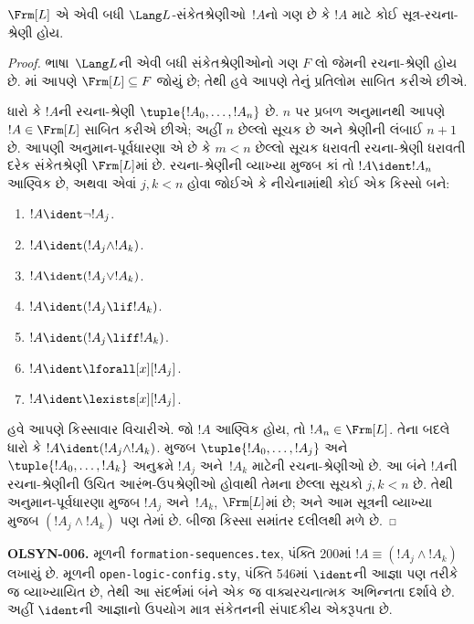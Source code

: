\begin{thm}
$\Frm[L]$ એ એવી બધી $\Lang L$-સંકેતશ્રેણીઓ~$!A$નો ગણ છે કે
$!A$ માટે કોઈ સૂત્ર-રચના-શ્રેણી હોય.
\end{thm}

\begin{proof}
ભાષા~$\Lang L$ની એવી બધી સંકેતશ્રેણીઓનો ગણ $F$ લો જેમની
રચના-શ્રેણી હોય છે. માં આપણે
$\Frm[L] \subseteq F$ જોયું છે; તેથી હવે આપણે તેનું પ્રતિલોમ
સાબિત કરીએ છીએ.

ધારો કે $!A$ની રચના-શ્રેણી $\tuple{!A_0,\dotsc,!A_n}$ છે. $n$ પર
પ્રબળ અનુમાનથી આપણે $!A \in \Frm[L]$ સાબિત કરીએ છીએ; અહીં $n$ છેલ્લો
સૂચક છે અને શ્રેણીની લંબાઈ $n+1$ છે. આપણી અનુમાન-પૂર્વધારણા એ છે કે
$m < n$ છેલ્લો સૂચક ધરાવતી રચના-શ્રેણી ધરાવતી દરેક
સંકેતશ્રેણી $\Frm[L]$માં છે. રચના-શ્રેણીની વ્યાખ્યા મુજબ કાં તો
$!A \ident !A_n$ આણ્વિક છે, અથવા એવાં $j,k < n$ હોવા જોઈએ કે
નીચેનામાંથી કોઈ એક કિસ્સો બને:
\begin{enumerate}
    \item $!A \ident \lnot !A_j$.%
    \item $!A \ident (!A_j \land !A_k)$.%
    \item $!A \ident (!A_j \lor !A_k)$.%
    \item $!A \ident (!A_j \lif !A_k)$.%
    \item $!A \ident (!A_j \liff !A_k)$.%
    \item $!A \ident \lforall[x][!A_j]$.%
    \item $!A \ident \lexists[x][!A_j]$.%
\end{enumerate}
હવે આપણે કિસ્સાવાર વિચારીએ. જો $!A$ આણ્વિક હોય, તો
$!A_n \in \Frm[L]$. તેના બદલે ધારો કે
$!A \ident (!A_j \land !A_k)$. 
મુજબ $\tuple{!A_0,\dotsc,!A_j}$ અને $\tuple{!A_0,\dotsc,!A_k}$ અનુક્રમે
$!A_j$ અને~$!A_k$ માટેની રચના-શ્રેણીઓ છે. આ બંને $!A$ની
રચના-શ્રેણીની ઉચિત આરંભ-ઉપશ્રેણીઓ હોવાથી તેમના છેલ્લા સૂચકો $j,k<n$ છે.
તેથી અનુમાન-પૂર્વધારણા મુજબ $!A_j$ અને~$!A_k$, $\Frm[L]$માં છે;
અને આમ સૂત્રની વ્યાખ્યા મુજબ $(!A_j \land !A_k)$ પણ તેમાં છે.
બીજા કિસ્સા સમાંતર દલીલથી મળે છે.
\end{proof}
\begin{editorial}
\textbf{OLSYN-006.} મૂળની \texttt{formation-sequences.tex}, પંક્તિ 200માં $!A\equiv(!A_j\land !A_k)$ લખાયું છે. મૂળની \texttt{open-logic-config.sty}, પંક્તિ 546માં $\ident$ની આજ્ઞા પણ \texttt{\string\equiv} તરીકે જ વ્યાખ્યાયિત છે, તેથી આ સંદર્ભમાં બંને એક જ વાક્યરચનાત્મક અભિન્નતા દર્શાવે છે. અહીં $\ident$ની આજ્ઞાનો ઉપયોગ માત્ર સંકેતનની સંપાદકીય એકરૂપતા છે.
\end{editorial}

